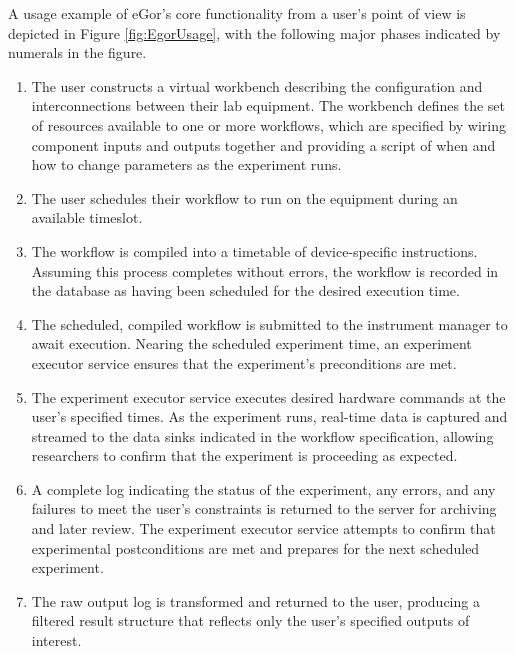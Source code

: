 \documentclass[../thesis]{subfiles}
\begin{document}
A usage example of eGor's core functionality from a user's point of
view is depicted in Figure \ref{fig:EgorUsage}, with the following
major phases indicated by numerals in the figure.
\begin{enumerate}
  \item{
      The user constructs a virtual workbench describing the
      configuration and interconnections between their lab
      equipment. The workbench defines the set of resources available
      to one or more workflows, which are specified by wiring
      component inputs and outputs together and providing a script of
      when and how to change parameters as the experiment runs.
  }
  \item{
      The user schedules their workflow to run on the equipment during
      an available timeslot.
  }
  \item{
      The workflow is compiled into a timetable of device-specific
      instructions. Assuming this process completes without errors,
      the workflow is recorded in the database as having been
      scheduled for the desired execution time.
  }
  \item{
      The scheduled, compiled workflow is submitted to the instrument
      manager to await execution. Nearing the scheduled experiment
      time, an experiment executor service ensures that the experiment's
      preconditions are met.
  }
  \item{
      The experiment executor service executes desired hardware
      commands at the user's specified times. As the experiment runs,
      real-time data is captured and streamed to the data sinks
      indicated in the workflow specification, allowing researchers to
      confirm that the experiment is proceeding as expected.
  }
  \item{
      A complete log indicating the status of the experiment, any
      errors, and any failures to meet the user's constraints is
      returned to the server for archiving and later review. The
      experiment executor service attempts to confirm that experimental
      postconditions are met and prepares for the next scheduled
      experiment.
  }
  \item{
      The raw output log is transformed and returned to the user,
      producing a filtered result structure that reflects only the
      user's specified outputs of interest.
  }
\end{enumerate}
\end{document}
